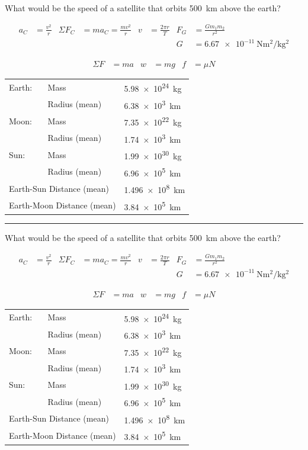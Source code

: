 \documentclass[12pt]{exam}
\begin{document}
\newcommand{\qu}{
  What would be the speed of a satellite that orbits 500~km above the earth?


  \begin{align*}
    a_C        &= \frac{v^2}{r} &
    \Sigma F_C &= ma_C = \frac{mv^2}{r}  &
    v          &= \frac{2\pi r}{T} &
    F_G        &= \frac{Gm_1 m_2}{r^2} \\
    &&&&&& G   &= \SI{6.67e-11}
                  {\newton\meter^2\per\kilo\gram^2}
  \end{align*}


  \begin{align*}
    \Sigma F &= ma &
    w        &= mg &
    f        &= \mu N
  \end{align*}


  \begin{center}
    \begin{tabular}{lll}
      \hline
      Earth: & Mass           & \SI{5.98e24}{\kilo\gram} \\
            & Radius (mean)  & \SI{6.38e3}{\kilo\meter} \\
      Moon:  & Mass           & \SI{7.35e22}{\kilo\gram} \\
            & Radius (mean)  & \SI{1.74e3}{\kilo\meter} \\
      Sun:   & Mass           & \SI{1.99e30}{\kilo\gram} \\
            & Radius (mean)  & \SI{6.96e5}{\kilo\meter} \\ \hline
      \multicolumn{2}{l}{Earth-Sun Distance (mean)} & 
                                \SI{1.496e8}{\kilo\meter} \\
      \multicolumn{2}{l}{Earth-Moon Distance (mean)} & 
                                \SI{3.84e5}{\kilo\meter} \\
                                \hline\hline
    \end{tabular}
  \end{center}
}


\qu
\vs
\hrule
\vs
\qu


  
\end{document}
